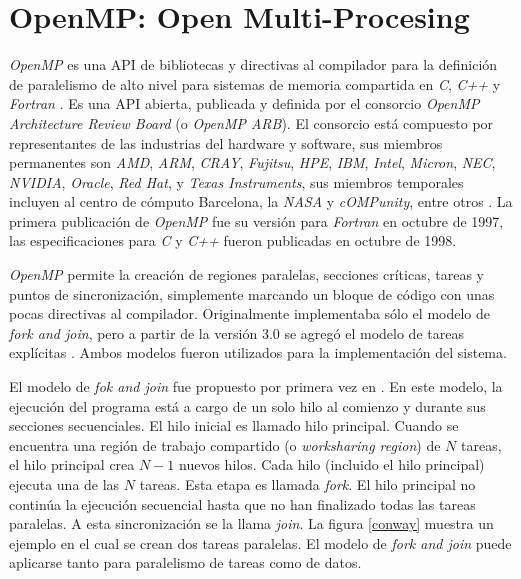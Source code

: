 
\section{OpenMP: Open Multi-Procesing}

\label{mt_openmp}

\emph{OpenMP} es una API de bibliotecas y directivas al compilador para la
definición de paralelismo de alto nivel para sistemas de memoria compartida en
\emph{C}, \emph{C++} y \emph{Fortran} \cite{ompWeb}. Es una API abierta,
publicada y definida por el consorcio \emph{OpenMP Architecture Review Board}
(o \emph{OpenMP ARB}). El consorcio está compuesto por representantes de las
industrias del hardware y software, sus miembros permanentes son \emph{AMD},
\emph{ARM}, \emph{CRAY}, \emph{Fujitsu}, \emph{HPE}, \emph{IBM}, \emph{Intel},
\emph{Micron}, \emph{NEC}, \emph{NVIDIA}, \emph{Oracle}, \emph{Red Hat}, y
\emph{Texas Instruments}, sus miembros temporales incluyen al centro de
cómputo Barcelona, la \emph{NASA} y \emph{cOMPunity}, entre otros
\cite{ompWeb}. La primera publicación de \emph{OpenMP} fue su versión para
\emph{Fortran} en octubre de 1997, las especificaciones para \emph{C} y
\emph{C++} fueron publicadas en octubre de 1998.

\emph{OpenMP} permite la creación de regiones paralelas, secciones críticas,
tareas y puntos de sincronización, simplemente marcando un bloque de código
con unas pocas directivas al compilador. Originalmente implementaba sólo el
modelo de \emph{fork and join}, pero a partir de la versión 3.0 se agregó el
modelo de tareas explícitas \cite{openmp08}. Ambos modelos fueron utilizados
para la implementación del sistema.

El modelo de \emph{fok and join} fue propuesto por primera vez en
\cite{conway1963}. En este modelo, la ejecución del programa está a cargo de un
solo hilo al comienzo y durante sus secciones secuenciales. El hilo inicial es
llamado hilo principal. Cuando se encuentra una región de trabajo compartido (o
\emph{worksharing region}) de $N$ tareas, el hilo principal crea $N-1$ nuevos
hilos. Cada hilo (incluido el hilo principal) ejecuta una de las $N$ tareas.
Esta etapa es llamada \emph{fork}. El hilo principal no continúa la ejecución
secuencial hasta que no han finalizado todas las tareas paralelas. A esta
sincronización se la llama \emph{join}. La figura \ref{conway} muestra un
ejemplo en el cual se crean dos tareas paralelas. El modelo de \emph{fork and
join} puede aplicarse tanto para paralelismo de tareas como de datos.

